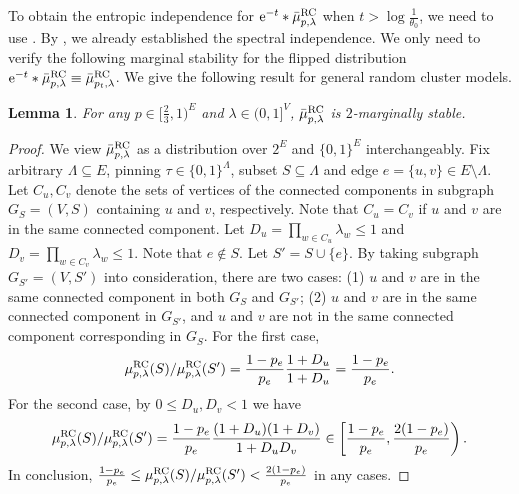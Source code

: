 \documentclass[11pt,a4paper]{article}
\newcommand{\e}{\mathrm{e}}
\newtheorem{lemma}[theorem]{Lemma}
\theoremstyle{definition}
\begin{document}
To obtain the entropic independence for $\e^{-t}*\bar{\mu}_{p,\lambda}^{\textnormal{RC}}$ when $t > \log\frac{1}{\theta_0}$, we need to use .
By , we already established the spectral independence. 
We only need to verify the following marginal stability for the flipped distribution $\e^{-t}*\bar{\mu}_{p,\lambda}^{\textnormal{RC}} \equiv \bar{\mu}_{p_t,\lambda}^{\textnormal{RC}}$.
We give the following result for general random cluster models.


\begin{lemma}\label{lem:rc-ms}
For any $p \in [\frac{2}{3},1)^E$ and $\lambda \in (0,1]^V$,
$\bar{\mu}_{p,\lambda}^{\textnormal{RC}}$ is $2$-marginally stable.   
\end{lemma}

\begin{proof}%
We view $\bar{\mu}_{p,\lambda}^{\textnormal{RC}}$ as a distribution over $2^E$ and $\{0,1\}^E$ interchangeably.
Fix arbitrary $\Lambda\subseteq E$, pinning $\tau\in \{0,1\}^{\Lambda}$, subset $S\subseteq \Lambda$ and edge $e=\{u,v\}\in E\setminus \Lambda$. Let $C_u, C_v$ denote the sets of vertices of the connected components in subgraph $G_S = (V,S)$ containing $u$ and $v$, respectively. Note that $C_u=C_v$ if $u$ and $v$ are in the same connected component. Let $D_u=\prod_{w\in C_u}\lambda_w\leq 1$ and $D_v=\prod_{w\in C_v}\lambda_w\leq 1$.
Note that $e \notin S$.
Let $S' = S \cup \{e\}$.
By taking subgraph $G_{S'} = (V,S')$ into consideration,
there are two cases: (1) $u$ and $v$ are in the same connected component in both $G_S$ and $G_{S'}$; (2) $u$ and $v$ are in the same connected component in $G_{S'}$, and $u$ and $v$ are not in the same connected component corresponding in $G_{S}$. For the first case, 
\begin{align*}
    \mu_{p,\lambda}^{\textnormal{RC}}(S)/ \mu_{p,\lambda}^{\textnormal{RC}}(S') = \frac{1-p_e}{p_e}\frac{1+D_u}{1+D_u} = \frac{1-p_e}{p_e}.
\end{align*}
For the second case, by $0\leq D_u,D_v<1$ we have
\begin{align*}
 \mu_{p,\lambda}^{\textnormal{RC}}(S)/ \mu_{p,\lambda}^{\textnormal{RC}}(S') = \frac{1-p_e}{p_e} \frac{(1+D_u)(1+D_v)}{1+D_u D_v} \in \left[\frac{1-p_e}{p_e},\frac{2(1-p_e)}{p_e}\right).
\end{align*}
In conclusion, $\frac{1-p_e}{p_e}\leq\mu_{p,\lambda}^{\textnormal{RC}}(S)/ \mu_{p,\lambda}^{\textnormal{RC}}(S')<\frac{2(1-p_e)}{p_e}$ in any cases.

\end{proof}
\end{document}
